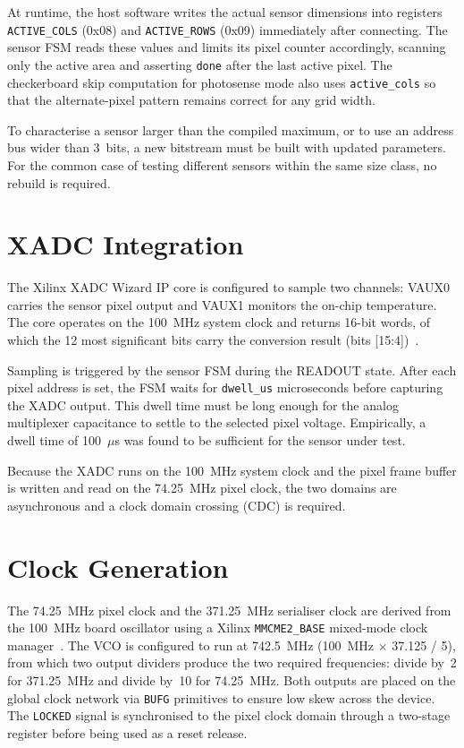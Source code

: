 At runtime, the host software writes the actual sensor dimensions into registers \texttt{ACTIVE\_COLS} (0x08) and \texttt{ACTIVE\_ROWS} (0x09) immediately after connecting. The sensor FSM reads these values and limits its pixel counter accordingly, scanning only the active area and asserting \texttt{done} after the last active pixel. The checkerboard skip computation for photosense mode also uses \texttt{active\_cols} so that the alternate-pixel pattern remains correct for any grid width.

To characterise a sensor larger than the compiled maximum, or to use an address bus wider than 3~bits, a new bitstream must be built with updated parameters. For the common case of testing different sensors within the same size class, no rebuild is required.


\section{XADC Integration}

The Xilinx XADC Wizard IP core is configured to sample two channels: VAUX0 carries the sensor pixel output and VAUX1 monitors the on-chip temperature. The core operates on the 100~MHz system clock and returns 16-bit words, of which the 12 most significant bits carry the conversion result (bits [15:4])~\cite{ug480}.

Sampling is triggered by the sensor FSM during the READOUT state. After each pixel address is set, the FSM waits for \texttt{dwell\_us} microseconds before capturing the XADC output. This dwell time must be long enough for the analog multiplexer capacitance to settle to the selected pixel voltage. Empirically, a dwell time of 100~$\mu$s was found to be sufficient for the sensor under test.

Because the XADC runs on the 100~MHz system clock and the pixel frame buffer is written and read on the 74.25~MHz pixel clock, the two domains are asynchronous and a clock domain crossing (CDC) is required.

\section{Clock Generation}

The 74.25~MHz pixel clock and the 371.25~MHz serialiser clock are derived from the 100~MHz board oscillator using a Xilinx \texttt{MMCME2\_BASE} mixed-mode clock manager~\cite{ug472}. The VCO is configured to run at 742.5~MHz (100~MHz $\times$ 37.125 / 5), from which two output dividers produce the two required frequencies: divide by~2 for 371.25~MHz and divide by~10 for 74.25~MHz. Both outputs are placed on the global clock network via \texttt{BUFG} primitives to ensure low skew across the device. The \texttt{LOCKED} signal is synchronised to the pixel clock domain through a two-stage register before being used as a reset release.

